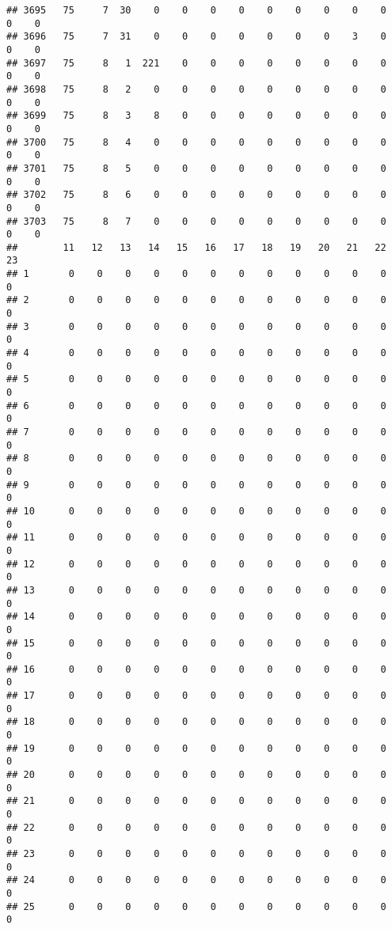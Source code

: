 \documentclass[]{article}
\begin{document}
\begin{verbatim}
## 3695   75     7  30    0    0    0    0    0    0    0    0    0    0    0
## 3696   75     7  31    0    0    0    0    0    0    0    3    0    0    0
## 3697   75     8   1  221    0    0    0    0    0    0    0    0    0    0
## 3698   75     8   2    0    0    0    0    0    0    0    0    0    0    0
## 3699   75     8   3    8    0    0    0    0    0    0    0    0    0    0
## 3700   75     8   4    0    0    0    0    0    0    0    0    0    0    0
## 3701   75     8   5    0    0    0    0    0    0    0    0    0    0    0
## 3702   75     8   6    0    0    0    0    0    0    0    0    0    0    0
## 3703   75     8   7    0    0    0    0    0    0    0    0    0    0    0
##        11   12   13   14   15   16   17   18   19   20   21   22   23
## 1       0    0    0    0    0    0    0    0    0    0    0    0    0
## 2       0    0    0    0    0    0    0    0    0    0    0    0    0
## 3       0    0    0    0    0    0    0    0    0    0    0    0    0
## 4       0    0    0    0    0    0    0    0    0    0    0    0    0
## 5       0    0    0    0    0    0    0    0    0    0    0    0    0
## 6       0    0    0    0    0    0    0    0    0    0    0    0    0
## 7       0    0    0    0    0    0    0    0    0    0    0    0    0
## 8       0    0    0    0    0    0    0    0    0    0    0    0    0
## 9       0    0    0    0    0    0    0    0    0    0    0    0    0
## 10      0    0    0    0    0    0    0    0    0    0    0    0    0
## 11      0    0    0    0    0    0    0    0    0    0    0    0    0
## 12      0    0    0    0    0    0    0    0    0    0    0    0    0
## 13      0    0    0    0    0    0    0    0    0    0    0    0    0
## 14      0    0    0    0    0    0    0    0    0    0    0    0    0
## 15      0    0    0    0    0    0    0    0    0    0    0    0    0
## 16      0    0    0    0    0    0    0    0    0    0    0    0    0
## 17      0    0    0    0    0    0    0    0    0    0    0    0    0
## 18      0    0    0    0    0    0    0    0    0    0    0    0    0
## 19      0    0    0    0    0    0    0    0    0    0    0    0    0
## 20      0    0    0    0    0    0    0    0    0    0    0    0    0
## 21      0    0    0    0    0    0    0    0    0    0    0    0    0
## 22      0    0    0    0    0    0    0    0    0    0    0    0    0
## 23      0    0    0    0    0    0    0    0    0    0    0    0    0
## 24      0    0    0    0    0    0    0    0    0    0    0    0    0
## 25      0    0    0    0    0    0    0    0    0    0    0    0    0

\end{verbatim}
\end{document}
